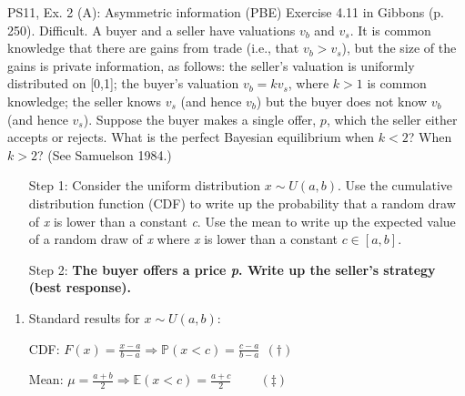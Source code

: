 \begin{frame}{PS11, Ex. 2 (A): Asymmetric information (PBE)}
    Exercise 4.11 in Gibbons (p. 250). Difficult. A buyer and a seller have valuations $v_b$ and $v_s$. It is common knowledge that there are gains from trade (i.e., that $v_b > v_s$), but the size of the gains is private information, as follows: the seller’s valuation is uniformly distributed on [0,1]; the buyer’s valuation $v_b = kv_s$, where $k > 1$ is common knowledge; the seller knows $v_s$ (and hence $v_b$) but the buyer does not know $v_b$ (and hence $v_s$). Suppose the buyer makes a single offer, $p$, which the seller either accepts or rejects. What is the perfect Bayesian equilibrium when $k < 2$? When $k > 2$? (See Samuelson 1984.) \vspace{-8pt}
    \begin{multicols}{2}
      \begin{itemize}
        \item[Step 1:] Consider the uniform distribution $x\sim U(a, b)$. Use the cumulative distribution function (CDF) to write up the probability that a random draw of \textit{x} is lower than a constant \textit{c}. Use the mean to write up the expected value of a random draw of \textit{x} where \textit{x} is lower than a constant $c\in[a,b]$.
        \item[Step 2:] \textbf{The buyer offers a price \textit{p}. Write up the seller's strategy (best response).}
      \end{itemize}
      \vfill\null\columnbreak
      \begin{enumerate}
        \item Standard results for $x\sim U(a, b):$
        \item[CDF:] $F(x)=\frac{x-a}{b-a}\Rightarrow\mathbb{P}(x<c)=\frac{c-a}{b-a}\ \ (\dagger)$
        \item[Mean:] $\mu=\frac{a+b}{2}\Rightarrow\mathbb{E}(x<c)=\frac{a+c}{2}\quad\quad\ (\ddagger)$
      \end{enumerate}
      \vfill\null
    \end{multicols}
\end{frame}
